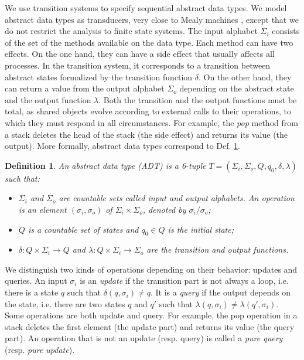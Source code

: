 \documentclass[9pt,numbers]{sigplanconf}
\newtheorem{definition}{Definition}
\begin{document}
We use transition systems to specify sequential abstract data types. 
We model abstract data types as transducers, very close to Mealy machines 
\cite{mealy1955method}, except that we do not restrict the analysis
to finite state systems. The input alphabet $\Sigma_i$ consists of
the set of the methods available on the data type. Each method can have two effects. 
On the one hand, they can have a side effect that usually affects all processes. In the transition system, 
it corresponds to a transition between abstract states formalized by the transition function $\delta$. 
On the other hand, they can return a value from the output alphabet $\Sigma_o$ depending on the abstract state
and the output function $\lambda$. Both the transition and the output functions must be total, as shared objects
evolve according to external calls to their operations, to which they must respond in all circumstances.
For example, the \emph{pop} method from a stack deletes the
head of the stack (the side effect) and returns its value (the output). 
More formally, abstract data types correspond to Def. \ref{def:adt}.

\vspace{1mm}
\begin{definition}\label{def:adt}
  An \emph{abstract data type} (ADT) is a 6-tuple \linebreak $T = (\Sigma_i, \Sigma_o, Q, q_0, \delta, \lambda)$ such that:
  \begin{itemize}
  \item\vspace{2mm}  $\Sigma_i$ and $\Sigma_o$ are countable sets called \emph{input} and \emph{output} alphabets. 
    An \emph{operation} is an element $(\sigma_i, \sigma_o)$ of  $\Sigma_i \times \Sigma_o$, denoted by $\sigma_i/\sigma_o$;
  \item\vspace{2mm}  $Q$ is a countable set of \emph{states} and $q_0 \in Q$ is the \emph{initial state};
  \item\vspace{2mm}  $\delta :  Q\times \Sigma_i\rightarrow Q$ and $\lambda : Q\times \Sigma_i\rightarrow \Sigma_o$ are the \emph{transition} and \emph{output} functions.
  \end{itemize}
\end{definition}
\vspace{1mm}

We distinguish two kinds of operations depending on their behavior: updates and queries. 
An input $\sigma_i$ is an \emph{update} if the transition part is not always a loop, i.e. 
there is a state $q$ such that $\delta(q,\sigma_i)\neq q$.
It is a \emph{query} if the output depends on the state, i.e. there are two states $q$ and $q'$
such that $\lambda(q,\sigma_i)\neq\lambda(q',\sigma_i)$.
Some operations are both update and query. For example, the pop operation in a stack 
deletes the first element (the update part) and returns its value (the query part).
An operation that is not an update (resp. query) is called a \emph{pure query} 
(resp. \emph{pure update}).
\end{document}
